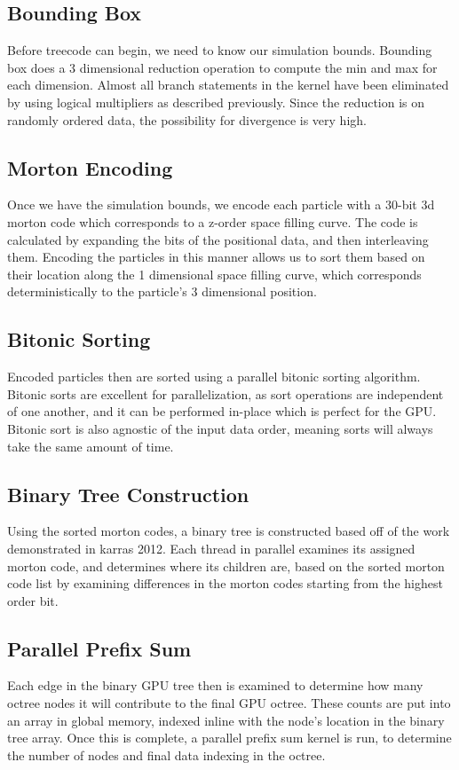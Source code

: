 \documentclass[fleqn,10pt]{SelfArx} %
\begin{document}
\subsection{Bounding Box}
Before treecode can begin, we need to know our simulation bounds. Bounding box does a 3 dimensional reduction operation to compute the min and max for each dimension. Almost all branch statements in the kernel have been eliminated by using logical multipliers as described previously. Since the reduction is on randomly ordered data, the possibility for divergence is very high. 

\subsection{Morton Encoding}
Once we have the simulation bounds, we encode each particle with a 30-bit 3d morton code which corresponds to a z-order space filling curve. The code is calculated by expanding the bits of the positional data, and then interleaving them. Encoding the particles in this manner allows us to sort them based on their location along the 1 dimensional space filling curve, which corresponds deterministically to the particle’s 3 dimensional position.

\subsection{Bitonic Sorting}
Encoded particles then are sorted using a parallel bitonic sorting algorithm. Bitonic sorts are excellent for parallelization, as sort operations are independent of one another, and it can be performed in-place which is perfect for the GPU. Bitonic sort is also agnostic of the input data order, meaning sorts will always take the same amount of time.

\subsection{Binary Tree Construction}
Using the sorted morton codes, a binary tree is constructed based off of the work demonstrated in karras 2012. Each thread in parallel examines its assigned morton code, and determines where its children are, based on the sorted morton code list by examining differences in the morton codes starting from the highest order bit.

\subsection{Parallel Prefix Sum}
Each edge in the binary GPU tree then is examined to determine how many octree nodes it will contribute to the final GPU octree. These counts are put into an array in global memory, indexed inline with the node’s location in the binary tree array. Once this is complete, a parallel prefix sum kernel is run, to determine the number of nodes and final data indexing in the octree. 
\end{document}
